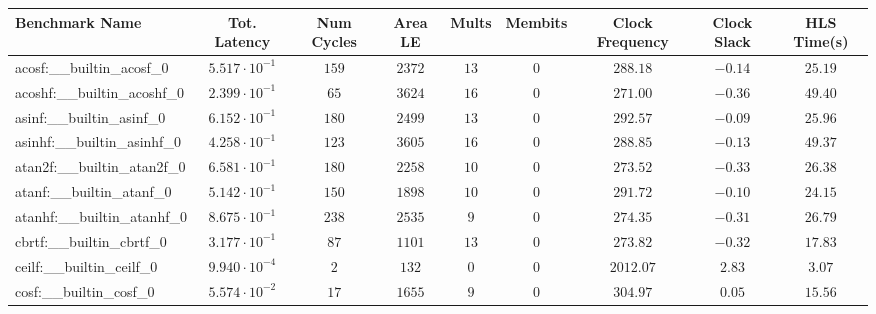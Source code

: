 \begin{tabular}{|l|c|c|c|c|c|c|c|c|}
\hline
Benchmark Name                            & Tot. Latency            & Num Cycles & Area LE   & Mults   & Membits & Clock Frequency & Clock Slack & HLS Time(s) \\
\hline
acosf:\_\_builtin\_acosf\_0               & $ 5.517 \cdot 10^{-1} $ & $ 159    $ & $ 2372  $ & $ 13  $ & $ 0   $ & $ 288.18      $ & $ -0.14   $ & $ 25.19   $ \\
acoshf:\_\_builtin\_acoshf\_0             & $ 2.399 \cdot 10^{-1} $ & $ 65     $ & $ 3624  $ & $ 16  $ & $ 0   $ & $ 271.00      $ & $ -0.36   $ & $ 49.40   $ \\
asinf:\_\_builtin\_asinf\_0               & $ 6.152 \cdot 10^{-1} $ & $ 180    $ & $ 2499  $ & $ 13  $ & $ 0   $ & $ 292.57      $ & $ -0.09   $ & $ 25.96   $ \\
asinhf:\_\_builtin\_asinhf\_0             & $ 4.258 \cdot 10^{-1} $ & $ 123    $ & $ 3605  $ & $ 16  $ & $ 0   $ & $ 288.85      $ & $ -0.13   $ & $ 49.37   $ \\
atan2f:\_\_builtin\_atan2f\_0             & $ 6.581 \cdot 10^{-1} $ & $ 180    $ & $ 2258  $ & $ 10  $ & $ 0   $ & $ 273.52      $ & $ -0.33   $ & $ 26.38   $ \\
atanf:\_\_builtin\_atanf\_0               & $ 5.142 \cdot 10^{-1} $ & $ 150    $ & $ 1898  $ & $ 10  $ & $ 0   $ & $ 291.72      $ & $ -0.10   $ & $ 24.15   $ \\
atanhf:\_\_builtin\_atanhf\_0             & $ 8.675 \cdot 10^{-1} $ & $ 238    $ & $ 2535  $ & $ 9   $ & $ 0   $ & $ 274.35      $ & $ -0.31   $ & $ 26.79   $ \\
cbrtf:\_\_builtin\_cbrtf\_0               & $ 3.177 \cdot 10^{-1} $ & $ 87     $ & $ 1101  $ & $ 13  $ & $ 0   $ & $ 273.82      $ & $ -0.32   $ & $ 17.83   $ \\
ceilf:\_\_builtin\_ceilf\_0               & $ 9.940 \cdot 10^{-4} $ & $ 2      $ & $ 132   $ & $ 0   $ & $ 0   $ & $ 2012.07     $ & $ 2.83    $ & $ 3.07    $ \\
cosf:\_\_builtin\_cosf\_0                 & $ 5.574 \cdot 10^{-2} $ & $ 17     $ & $ 1655  $ & $ 9   $ & $ 0   $ & $ 304.97      $ & $ 0.05    $ & $ 15.56   $ \\

\end{tabular}
